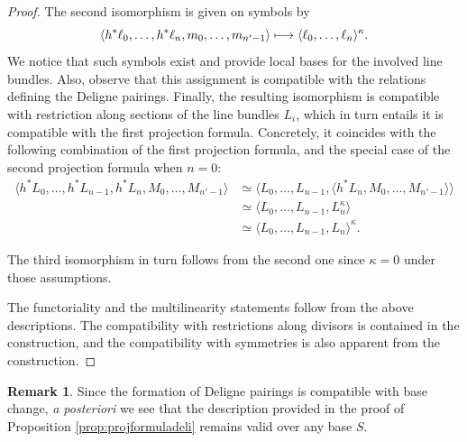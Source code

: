 \documentclass[JEP,XML,SOM,Unicode,published]{cedram}
\newcommand\mto{\mathchoice{\longmapsto}{\mapsto}{\mapsto}{\mapsto}}
\theoremstyle{plain}
\theoremstyle{definition}
\newtheorem{remark}[theorem]{Remark}
\begin{document}
\begin{proof}
The second isomorphism is given on symbols by
\begin{equation}\label{eq:explicit-second-projection-formula}
\langle h^{\ast} \ell_{0},\ldots, h^{\ast}\ell_{n},m_{0},\ldots, m_{n^{\prime}-1}\rangle\mto \langle \ell_{0},\ldots,\ell_{n} \rangle^{\kappa}.
\end{equation}
We notice that such symbols exist and provide local bases for the involved line bundles. Also, observe that this assignment is compatible with the relations defining the Deligne pairings. Finally, the resulting isomorphism is compatible with restriction along sections of the line bundles $L_{i}$, which in turn entails it is compatible with the first projection formula. Concretely, it coincides with the following combination of the first projection formula, and the special case of the second projection formula when $n=0$:
\begin{displaymath}
\begin{split}
\langle h^\ast L_0, \ldots, h^\ast L_{n-1}, h^\ast L_n, M_0, \ldots, M_{n'-1} \rangle & \simeq \langle L_0, \ldots, L_{n-1}, \langle h^\ast L_n, M_0, \ldots, M_{n'-1} \rangle \rangle \\
& \simeq \langle L_0, \ldots, L_{n-1}, L_n^{\kappa} \rangle \\
& \simeq \langle L_0, \ldots, L_{n-1}, L_n \rangle^{\kappa}.
\end{split}
\end{displaymath}

The third isomorphism in turn follows from the second one since $\kappa = 0$ under those assumptions.

The functoriality and the multilinearity statements follow from the above descriptions. The compatibility with restrictions along divisors is contained in the construction, and the compatibility with symmetries is also apparent from the construction.
\end{proof}

\begin{remark}
Since the formation of Deligne pairings is compatible with base change, \emph{a posteriori} we see that the description provided in the proof of Proposition \ref{prop:projformuladeli} remains valid over any base $S$.
\end{remark}
\end{document}
